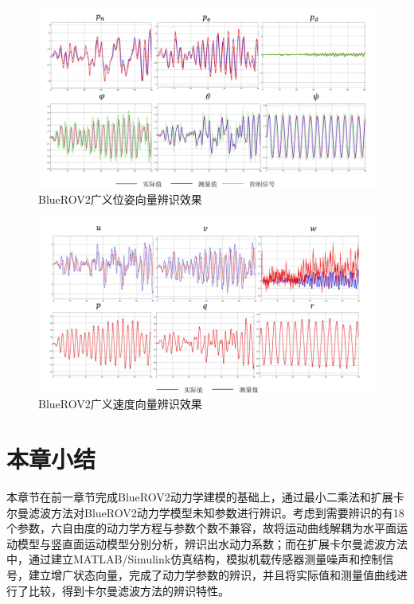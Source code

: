\begin{figure}[hbt]
    \centering
    \includegraphics[width=0.8\linewidth]{images/chapter3/EKF_position.png}
    \caption{BlueROV2广义位姿向量辨识效果}
    \label{f.EKF_position}
\end{figure}
\begin{figure}[hbt]
    \centering
    \includegraphics[width=0.8\linewidth]{images/chapter3/EKF_vel.png}
    \caption{BlueROV2广义速度向量辨识效果}
    \label{f.EKF_vel}
\end{figure}

\section{本章小结}

本章节在前一章节完成BlueROV2动力学建模的基础上，通过最小二乘法和扩展卡尔曼滤波方法对BlueROV2动力学模型未知参数进行辨识。考虑到需要辨识的有18个参数，六自由度的动力学方程与参数个数不兼容，故将运动曲线解耦为水平面运动模型与竖直面运动模型分别分析，辨识出水动力系数；而在扩展卡尔曼滤波方法中，通过建立MATLAB/Simulink仿真结构，模拟机载传感器测量噪声和控制信号，建立增广状态向量，完成了动力学参数的辨识，并且将实际值和测量值曲线进行了比较，得到卡尔曼滤波方法的辨识特性。

\newpage
